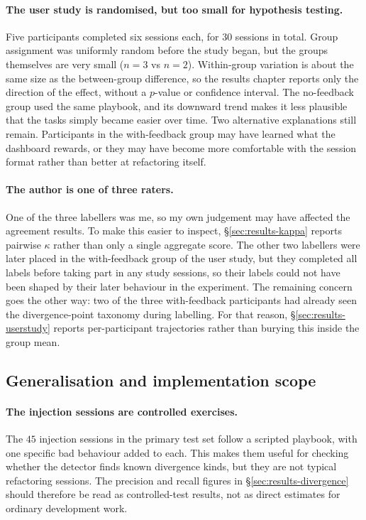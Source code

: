 \paragraph{The user study is randomised, but too small for hypothesis testing.}
Five participants completed six sessions each, for $30$ sessions in total. Group assignment was uniformly random before the study began, but the groups themselves are very small ($n = 3$ vs $n = 2$). Within-group variation is about the same size as the between-group difference, so the results chapter reports only the direction of the effect, without a $p$-value or confidence interval. The no-feedback group used the same playbook, and its downward trend makes it less plausible that the tasks simply became easier over time. Two alternative explanations still remain. Participants in the with-feedback group may have learned what the dashboard rewards, or they may have become more comfortable with the session format rather than better at refactoring itself.

\paragraph{The author is one of three raters.}
One of the three labellers was me, so my own judgement may have affected the agreement results. To make this easier to inspect, \S\ref{sec:results-kappa} reports pairwise $\kappa$ rather than only a single aggregate score. The other two labellers were later placed in the with-feedback group of the user study, but they completed all labels before taking part in any study sessions, so their labels could not have been shaped by their later behaviour in the experiment. The remaining concern goes the other way: two of the three with-feedback participants had already seen the divergence-point taxonomy during labelling. For that reason, \S\ref{sec:results-userstudy} reports per-participant trajectories rather than burying this inside the group mean.

\subsection{Generalisation and implementation scope}
\label{sec:threats-external}

\paragraph{The injection sessions are controlled exercises.}
The $45$ injection sessions in the primary test set follow a scripted playbook, with one specific bad behaviour added to each. This makes them useful for checking whether the detector finds known divergence kinds, but they are not typical refactoring sessions. The precision and recall figures in \S\ref{sec:results-divergence} should therefore be read as controlled-test results, not as direct estimates for ordinary development work.

